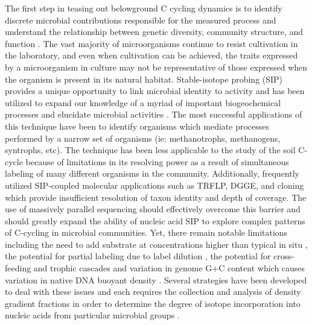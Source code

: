 The first step in teasing out belowground C cycling dynamics is to identify discrete microbial contributions responsible for the measured process and understand the relationship between genetic diversity, community structure, and function \cite{O_Donnell_2002}. The vast majority of microorganisms continue to resist cultivation in the laboratory, and even when cultivation can be achieved, the traits expressed by a microorganism in culture may not be representative of those expressed when the organism is present in its natural habitat. Stable-isotope probing (SIP) provides a unique opportunity to link microbial identity to activity and has been utilized to expand our knowledge of a myriad of important biogeochemical processes and elucidate microbial activities \cite{Chen_Murrell_2010}. The most successful applications of this technique have been to identify organisms which mediate processes performed by a narrow set of organisms (ie: methanotrophs, methanogens, syntrophs, etc). The technique has been less applicable to the study of the soil C-cycle because of limitations in its resolving power as a result of simultaneous labeling of many different organisms in the community. Additionally, frequently utilized SIP-coupled molecular applications such as TRFLP, DGGE, and cloning which provide insufficient resolution of taxon identity and depth of coverage. The use of massively parallel sequencing should effectively overcome this barrier and should greatly expand the ability of nucleic acid SIP to explore complex patterns of C-cycling in microbial communities. Yet, there remain notable limitations including the need to add substrate at concentrations higher than typical in situ \cite{radajewski2000stable}, the potential for partial labeling due to label dilution \cite{radajewski2000stable,Manefield_2002,McDonald_2005}, the potential for cross-feeding and trophic cascades \cite{Morris_2002,Hutchens_2003,Lueders_2003,DeRito_2005,Mahmood_2005,McDonald_2005,Ziegler_2005} and variation in genome G+C content which causes variation in native DNA buoyant density \cite{Buckley_2007,9780408708036,HOLBEN_1995,9546163}. Several strategies have been developed to deal with these issues and each requires the collection and analysis of density gradient fractions in order to determine the degree of isotope incorporation into nucleic acids from particular microbial groups \cite{Manefield_2002,Manefield_2002,14686943}. 

